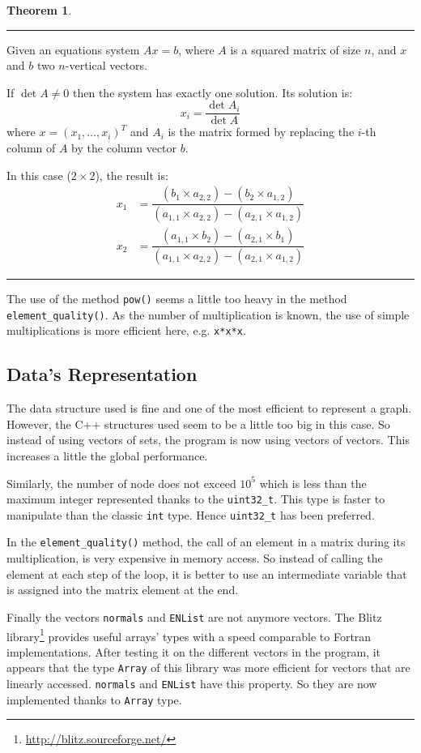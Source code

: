 \documentclass[fleqn,11pt]{SelfArx} %
\theoremstyle{definition}
\newtheorem{theorem}{Theorem}
\begin{document}
\begin{theorem}
\hrule \vspace*{1pt}
Given an equations system $Ax = b$, where $A$ is a squared matrix of size $n$, and $x$ and $b$ two $n$-vertical vectors.

If $\det A \neq 0$ then the system has exactly one solution. Its solution is:
\[x_i = \dfrac{\det A_i}{\det A}\]
where $x = (x_1,\dots,x_i)^T$ and $A_i$ is the matrix formed by replacing the $i$-th column of $A$  by the column vector $b$. 

In this case ($2\times2$), the result is:
\begin{align*}
x_1 &= \dfrac{(b_1 \times a_{2,2}) - (b_2 \times a_{1,2})}{(a_{1,1} \times a_{2,2}) - (a_{2,1} \times a_{1,2})} \\
x_2 &= \dfrac{(a_{1,1} \times b_2) - (a_{2,1} \times b_1)}{(a_{1,1} \times a_{2,2}) - (a_{2,1} \times a_{1,2})}
\end{align*}
\hrule
\end{theorem}

The use of the method \verb+pow()+ seems a little too heavy in the method \verb+element_quality()+. As the number of multiplication is known, the use of simple multiplications is more efficient here, e.g. \verb+x*x*x+.

\subsection{Data's Representation}

The data structure used is fine and one of the most efficient to represent a graph. However, the C++ structures used seem to be a little too big in this case. So instead of using vectors of sets, the program is now using vectors of vectors. This increases a little the global performance.

Similarly, the number of node does not exceed $10^5$ which is less than the maximum integer represented thanks to the \verb+uint32_t+. This type is faster to manipulate than the classic \verb+int+ type. Hence \verb+uint32_t+ has been preferred.

In the \verb+element_quality()+ method, the call of an element in a matrix during its multiplication, is very expensive in memory access. So instead of calling the element at each step of the loop, it is better to use an intermediate variable that is assigned into the matrix element at the end.

Finally the vectors \verb+normals+ and \verb+ENList+ are not anymore vectors. The {Blitz library}\footnote{\url{http://blitz.sourceforge.net/}} provides useful arrays' types with a speed comparable to Fortran implementations. After testing it on the different vectors in the program, it appears that the type \verb+Array+ of this library was more efficient for vectors that are linearly accessed. \verb+normals+ and \verb+ENList+ have this property. So they are now implemented thanks to \verb+Array+ type.
\end{document}
